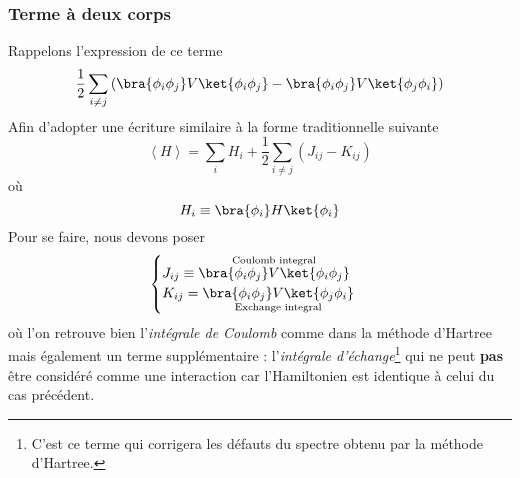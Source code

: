 \subsubsection{Terme à deux corps}
Rappelons l’expression de ce terme
\begin{equation}
\frac{1}{2}\sum_{i\neq j} \left(\bra{\phi_i\phi_j}V\ket{\phi_i\phi_j}-\bra{\phi_i\phi_j}V\ket{\phi_j\phi_i}\right)
\end{equation}
Afin d'adopter une écriture similaire à la forme traditionnelle suivante
\begin{equation}
\left\langle H\right\rangle = \sum_i H_i + \frac{1}{2} \sum_{i\neq j} (J_{ij}-K_{ij})
\end{equation}
où
\begin{equation}
H_i \equiv \bra{\phi_i}H\ket{\phi_i}
\end{equation}
Pour se faire, nous devons poser
\begin{equation}
\begin{cases}
J_{ij} \equiv \overset{\text{Coulomb integral}}{\bra{\phi_i\phi_j}V\ket{\phi_i\phi_j}}\\
K_{ij} = \underset{\text{Exchange integral}}{\bra{\phi_i\phi_j}V\ket{\phi_j\phi_i}}
\end{cases}
\end{equation}
où l'on retrouve bien l'\textit{intégrale de Coulomb} comme dans la méthode d'Hartree mais également un 
terme supplémentaire : l'\textit{intégrale d'échange}\footnote{C'est ce terme qui corrigera les défauts du 
spectre obtenu par la méthode d'Hartree.} qui ne peut \textbf{pas} être considéré comme une interaction car 
l'Hamiltonien est identique à celui du cas précédent.\\


